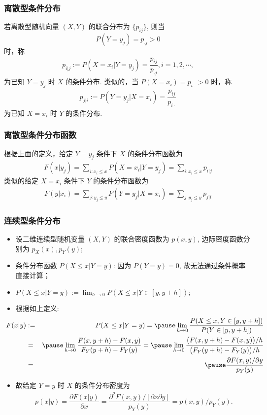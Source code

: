 \begin{frame}
	\frametitle{离散型条件分布}
	\begin{defi}
		若离散型随机向量 $(X,Y)$ 的联合分布为 $\{p_{ij}\}$, 则当 $$P (Y=y_j)=p_{\cdot j}>0$$ 时，称
		\begin{eqnarray*}
			p_{i|j}:=P(X=x_i|Y=y_j)=\dfrac{p_{ij}}{p_{\cdot j}}, i=1,2,\cdots,
		\end{eqnarray*}
		为已知 $Y=y_j$ 时 $X$ 的条件分布. \pause 类似的，当 $P (X=x_i)=p_{i\cdot}>0$ 时，称
		\begin{eqnarray*}
			p_{j|i}:=P(Y=y_j|X=x_i)=\dfrac{p_{ij}}{p_{i\cdot}}
		\end{eqnarray*}
		为已知 $X=x_i$ 时 $Y$ 的条件分布.
	\end{defi}

\end{frame}
\begin{frame}
	\frametitle{离散型条件分布函数}
	根据上面的定义，给定 $Y=y_j$ 条件下 $X$ 的条件分布函数为
	\begin{eqnarray*}
		F(x|y_j)=\sum_{i:x_i\le x}P(X=x_i|Y=y_j)=\sum_{i:x_i\le x}p_{i|j}
	\end{eqnarray*}
	\pause 类似的给定 $X=x_i$ 条件下 $Y$ 的条件分布函数为
	\begin{eqnarray*}
		F(y|x_i)=\sum_{j:y_j\le y}P(Y=y_j|X=x_i)=\sum_{j:y_j\le y}p_{j|i}
	\end{eqnarray*}

\end{frame}
\begin{frame}
	\frametitle{连续型条件分布}
	\begin{itemize}[<+-|alert@+>]
		\item 设二维连续型随机变量 $(X,Y)$ 的联合密度函数为 $p (x,y)$, 边际密度函数分别为 $p_X (x), p_Y (y)$;
		\item 条件分布函数 $P (X\le x|Y=y)$: 因为 $P (Y=y)=0$, 故无法通过条件概率直接计算；
		\item $P(X\le x|Y=y):=\lim_{h\rightarrow 0}P(X\le x|Y\in[y,y+h])$;
		\item 根据如上定义:\vspace{-0.3cm}
		{\small \begin{eqnarray*}
				\hspace{-0.5cm} F(x|y)&:=&P(X\le x|Y=y)=\pause \lim_{h\rightarrow 0}\dfrac{P(X\le x, Y\in[y,y+h])}{P(Y\in[y,y+h])}\\
				&=&\pause \lim_{h\rightarrow 0}\dfrac{F(x,y+h)-F(x,y)}{F_Y(y+h)-F_Y(y)}
				=\pause \lim_{h\rightarrow 0}\dfrac{\big(F(x,y+h)-F(x,y)\big)/h}{\big(F_Y(y+h)-F_Y(y)\big)/h}\\
				&=&\pause \dfrac{\partial F(x,y)/\partial y}{p_Y(y)}
		\end{eqnarray*}}%
		\item 故给定 $Y=y$ 时 $X$ 的条件分布密度为
		\begin{align*}
		   p (x|y)=\dfrac{\partial F(x|y)}{\partial x}=\dfrac{\partial^2 F(x,y)/[\partial x\partial y]}{p_Y(y)}=p(x,y)/p_Y (y).
		\end{align*}
	\end{itemize}
\end{frame}
